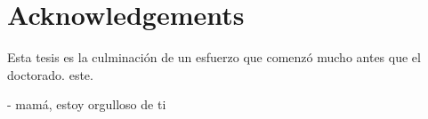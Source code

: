 
\chapter*{Acknowledgements}

Esta tesis es la culminación de un esfuerzo que comenzó mucho antes que el doctorado. 
este. 

- mamá, estoy orgulloso de ti





